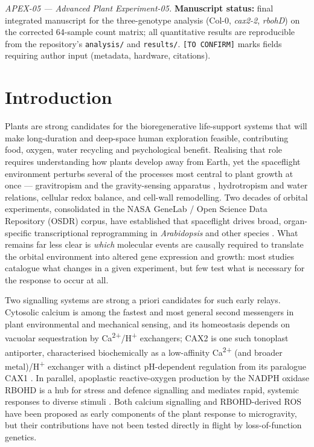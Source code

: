 \documentclass[pdflatex,sn-nature]{sn-jnl}
\begin{document}
\noindent\textit{APEX-05 --- Advanced Plant Experiment-05.} \textbf{Manuscript
status:} final integrated manuscript for the three-genotype analysis (Col-0,
\textit{cax2-2}, \textit{rbohD}) on the corrected 64-sample count matrix; all
quantitative results are reproducible from the repository's \texttt{analysis/} and
\texttt{results/}. \texttt{[TO CONFIRM]} marks fields requiring author input
(metadata, hardware, citations).

\section{Introduction}\label{sec:intro}

Plants are strong candidates for the bioregenerative life-support systems that will
make long-duration and deep-space human exploration feasible, contributing food,
oxygen, water recycling and psychological benefit. Realising that role requires
understanding how plants develop away from Earth, yet the spaceflight environment
perturbs several of the processes most central to plant growth at once ---
gravitropism and the gravity-sensing apparatus \cite{morita2026}, hydrotropism and
water relations, cellular redox balance, and cell-wall remodelling. Two decades of
orbital experiments, consolidated in the NASA GeneLab / Open Science Data Repository
(OSDR) corpus, have established that spaceflight drives broad, organ-specific
transcriptional reprogramming in \textit{Arabidopsis} and other species
\cite{paul2013,barker2023}. What remains far less clear is \textit{which} molecular
events are causally required to translate the orbital environment into altered gene
expression and growth: most studies catalogue what changes in a given experiment, but
few test what is necessary for the response to occur at all.

Two signalling systems are strong a priori candidates for such early relays.
Cytosolic calcium is among the fastest and most general second messengers in plant
environmental and mechanical sensing, and its homeostasis depends on vacuolar
sequestration by Ca\textsuperscript{2+}/H\textsuperscript{+} exchangers; CAX2 is one
such tonoplast antiporter, characterised biochemically as a low-affinity
Ca\textsuperscript{2+} (and broader metal)/H\textsuperscript{+} exchanger with a
distinct pH-dependent regulation from its paralogue CAX1 \cite{shigaki2003,pittman2005}.
In parallel, apoplastic reactive-oxygen production by the NADPH oxidase RBOHD is a hub
for stress and defence signalling and mediates rapid, systemic responses to diverse
stimuli \cite{torres2002,miller2009}. Both calcium signalling and RBOHD-derived ROS
have been proposed as early components of the plant response to microgravity, but
their contributions have not been tested directly in flight by loss-of-function
genetics.
\end{document}
